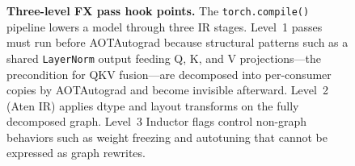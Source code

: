 \begin{figure}[H]
\begin{tikzpicture}
\end{tikzpicture}
\caption{\textbf{Three-level FX pass hook points.}
  The \texttt{torch.compile()} pipeline lowers a model through three IR stages.
  Level~1 passes must run before AOTAutograd because structural patterns such as
  a shared \texttt{LayerNorm} output feeding Q, K, and V projections---the
  precondition for QKV fusion---are decomposed into per-consumer copies by
  AOTAutograd and become invisible afterward.  Level~2 (Aten IR) applies
  dtype and layout transforms on the fully decomposed graph.  Level~3
  Inductor flags control non-graph behaviors such as weight freezing and
  autotuning that cannot be expressed as graph rewrites.}
\label{fig:cand:fxpasslevel}
\end{figure}
